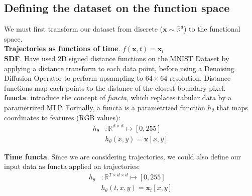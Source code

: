 \subsection{Defining the dataset on the function space}

We must first transform our dataset from discrete ($\mathbf{x} \sim \mathbb{R}^d$) to the functional space. \\

\noindent \textbf{Trajectories as functions of time}. $f(\mathbf{x}, t) = \mathbf{x}_t$ \\

\noindent \textbf{SDF}. \cite{lim2025scorebaseddiffusionmodelsfunction} Have used 2D signed distance functions on the MNIST Dataset by applying a distance transform to each data point, before using a Denoising Diffusion Operator to perform upsampling to $64\times64$ resolution. Distance functions map each points to the distance of the closest boundary pixel. \\

\noindent \textbf{functa}. \cite{dupont2022datafunctadatapoint} introduce the concept of \textit{functa}, which replaces tabular data by a parametrized MLP. Formally, a functa is a parametrized function $h_{\theta}$ that maps coordinates to features (RGB values):
\begin{align*}
  h_{\theta} & : \mathbb{R}^{d \times d} \mapsto [0, 255] \\
             & h_{\theta}(x, y) = \mathbf{x}[x, y]
\end{align*}

\noindent \textbf{Time functa}. Since we are considering trajectories, we could also define our input data as functa applied on trajectories:
\begin{align*}
  h_{\theta} & : \mathbb{R}^{T \times d \times d} \mapsto [0, 255] \\
             & h_{\theta}(t, x, y) = \mathbf{x}_t[x, y]
\end{align*}

